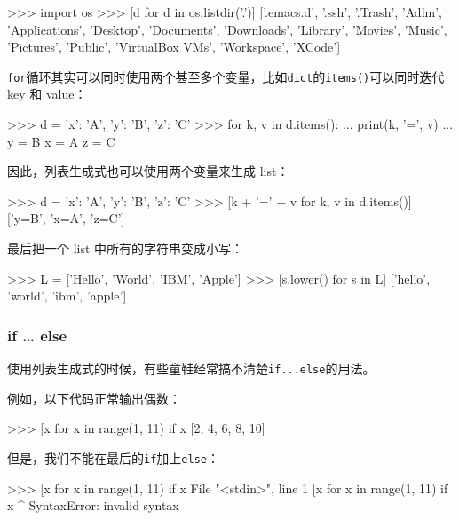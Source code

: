 \begin{pythoncode}
>>> import os 
>>> [d for d in os.listdir('.')] 
['.emacs.d', '.ssh', '.Trash', 'Adlm', 'Applications', 'Desktop', 'Documents', 'Downloads', 'Library', 'Movies', 'Music', 'Pictures', 'Public', 'VirtualBox VMs', 'Workspace', 'XCode']
\end{pythoncode}

\texttt{for}循环其实可以同时使用两个甚至多个变量，比如\texttt{dict}的\texttt{items()}可以同时迭代
key 和 value：

\begin{pythoncode}
>>> d = {'x': 'A', 'y': 'B', 'z': 'C' }
>>> for k, v in d.items():
...     print(k, '=', v)
...
y = B
x = A
z = C
\end{pythoncode}

因此，列表生成式也可以使用两个变量来生成 list：

\begin{pythoncode}
>>> d = {'x': 'A', 'y': 'B', 'z': 'C' }
>>> [k + '=' + v for k, v in d.items()]
['y=B', 'x=A', 'z=C']
\end{pythoncode}

最后把一个 list 中所有的字符串变成小写：

\begin{pythoncode}
>>> L = ['Hello', 'World', 'IBM', 'Apple']
>>> [s.lower() for s in L]
['hello', 'world', 'ibm', 'apple']
\end{pythoncode}

\hypertarget{if-else}{%
\subsubsection{if \ldots{} else}\label{if-else}}

使用列表生成式的时候，有些童鞋经常搞不清楚\texttt{if...else}的用法。

例如，以下代码正常输出偶数：

\begin{pythoncode}
>>> [x for x in range(1, 11) if x %
[2, 4, 6, 8, 10]
\end{pythoncode}

但是，我们不能在最后的\texttt{if}加上\texttt{else}：

\begin{pythoncode}
>>> [x for x in range(1, 11) if x %
  File "<stdin>", line 1
    [x for x in range(1, 11) if x %
                                              ^
SyntaxError: invalid syntax
\end{pythoncode}

